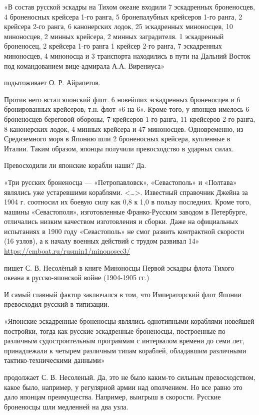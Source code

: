 \begin{textcitation}
«В состав русской эскадры на Тихом океане входили 7 эскадренных броненосцев, 4 броненосных крейсера 1-го ранга, 5 бронепалубных крейсеров 1-го ранга, 2 крейсера 2-го ранга, 6 канонерских лодок, 25 эскадренных миноносцев, 10 миноносцев, 2 минных крейсера, 2 минных заградителя. 1 эскадренный броненосец, 2 крейсера 1-го ранга 1 крейсер 2-го ранга, 7 эскадренных миноносцев, 4 миноносца и 3 транспорта находились в пути на Дальний Восток под командованием вице-адмирала А.А. Вирениуса»
\end{textcitation}
 подытоживает О. Р. Айрапетов.

Против него встал японский флот. 6 новейших эскадренных броненосцев и 6 бронированных крейсеров, т.н. флот «6 на 6». Кроме того, у японцев имелось 6 броненосцев береговой обороны, 7 крейсеров 1-го ранга, 11 крейсеров 2-го ранга, 8 канонерских лодок, 4 минных крейсера и 47 миноносцев. Одновременно, из Средиземного моря в Японию шли 2 броненосных крейсера, купленные в Италии. Таким образом, японцы получили превосходство в ударных силах.

Превосходили ли японские корабли наши? Да.
\begin{textcitation}
 «Три русских броненосца — «Петропавловск», «Севастополь» и «Полтава» являлись уже устаревшими кораблями. <…>. Известный справочник Джейна за 1904 г. соотносил их боевую силу как 0,8 к 1,0 в пользу последних. Кроме того, машины «Севастополя», изготовленные Франко-Русским заводом в Петербурге, отличались низким качеством изготовления и сборки. Даже на официальных испытаниях в 1900 году «Севастополь» не смог развить контрактной скорости (16 узлов), а к началу военных действий с трудом развивал 14» \url{https://cmboat.ru/rusmin1/minonosec3/}
\end{textcitation}
пишет С. В. Несолёный в книге Миноносцы Первой эскадры флота Тихого океана в русско-японской войне (1904-1905 гг.)

И самый главный фактор заключался в том, что Императорский флот Японии превосходил русский в типизации. 
\begin{textcitation}
«Японские эскадренные броненосцы являлись однотипными кораблями новейшей постройки, тогда как русские эскадренные броненосцы, построенные по различным судостроительным программам с интервалом времени до семи лет, принадлежали к четырем различным типам кораблей, обладавшим различными тактико-техническими данными»
\end{textcitation}
продолжает С. В. Несоленый. Да, это не было каким-то сильным превосходством, какое было, например, у регулярной армии над ополчением. Но все равно это дало японцам преимущества. Например, выигрыш в скорости. Русские броненосцы шли медленней на два узла.

